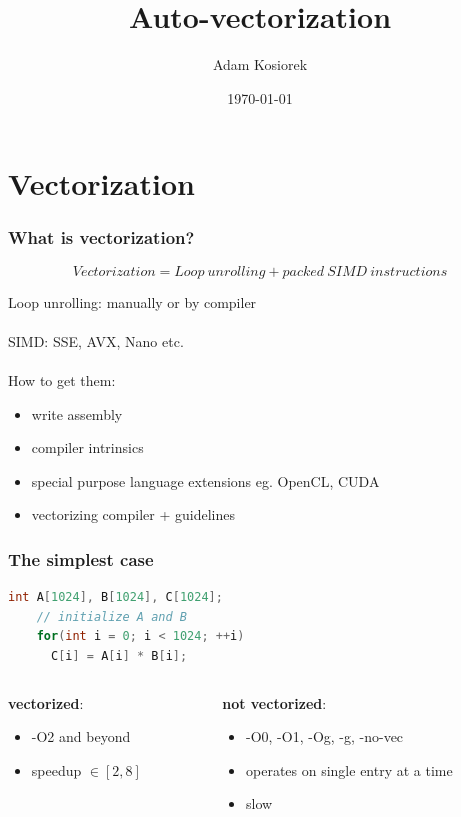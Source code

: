 \documentclass{beamer}
\title{Auto-vectorization}
\author{Adam Kosiorek}
\date {\today}
\begin{document}
\frame{\titlepage}


\section{Vectorization}

\begin{frame}[fragile]
  \frametitle{What is vectorization?}

  \begin{equation}
    Vectorization = {Loop\ unrolling} + {packed\ SIMD\ instructions}  
  \end{equation}
  
  Loop unrolling: manually or by compiler \\\ \\
  SIMD: SSE, AVX, Nano etc. \\\ \\
  How to get them:
  \begin{itemize}
   \item write assembly
   \item compiler intrinsics
   \item special purpose language extensions eg. OpenCL, CUDA
   \item vectorizing compiler + guidelines
  \end{itemize}
\end{frame}

\begin{frame}[fragile]
  \frametitle{The simplest case}
  
  \begin{lstlisting}[language=C++]
    int A[1024], B[1024], C[1024];
    // initialize A and B
    for(int i = 0; i < 1024; ++i) 
      C[i] = A[i] * B[i];   
  \end{lstlisting}
  
  \begin{columns}[onlytextwidth]
    \begin{column}{0.4\textwidth}
     \textbf{vectorized}:
     \begin{itemize}
      \item -O2 and beyond
      \item speedup $\in [2, 8]$
     \end{itemize}
    \end{column}
    
    \begin{column}{0.4\textwidth}
     \textbf{not vectorized}:
     \begin{itemize}
      \item -O0, -O1, -Og, -g, -no-vec
      \item operates on single entry at a time
      \item slow
     \end{itemize}
    \end{column}
  \end{columns}
  
\end{frame}
\end{document}
